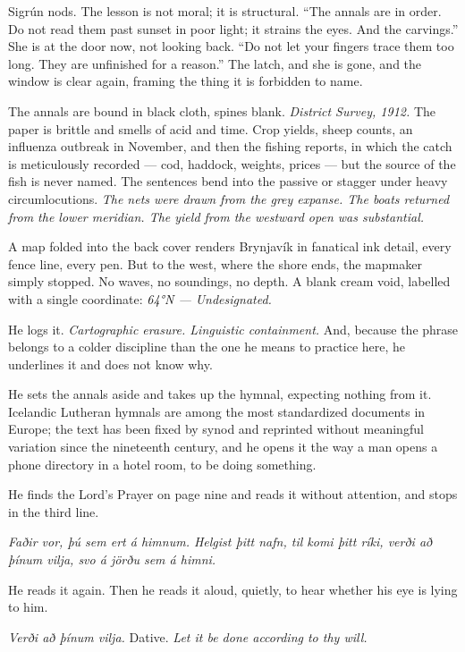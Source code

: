 \documentclass[11pt,oneside]{book}
\newcommand{\sceneline}{%
  \par\vspace{1.2em}
  \begin{center}
    \fontsize{11}{11}\selectfont \textbullet\quad\textbullet\quad\textbullet
  \end{center}
  \vspace{0.6em}\noindent\ignorespaces
}
\begin{document}
Sigrún nods. The lesson is not moral; it is structural. ``The annals are
in order. Do not read them past sunset in poor light; it strains the
eyes. And the carvings.'' She is at the door now, not looking back. ``Do
not let your fingers trace them too long. They are unfinished for a
reason.'' The latch, and she is gone, and the window is clear again,
framing the thing it is forbidden to name.

\sceneline

The annals are bound in black cloth, spines blank. \emph{District
Survey, 1912.} The paper is brittle and smells of acid and time. Crop
yields, sheep counts, an influenza outbreak in November, and then the
fishing reports, in which the catch is meticulously recorded --- cod,
haddock, weights, prices --- but the source of the fish is never named.
The sentences bend into the passive or stagger under heavy
circumlocutions. \emph{The nets were drawn from the grey expanse. The
boats returned from the lower meridian. The yield from the westward open
was substantial.}

A map folded into the back cover renders Brynjavík in fanatical ink
detail, every fence line, every pen. But to the west, where the shore
ends, the mapmaker simply stopped. No waves, no soundings, no depth. A
blank cream void, labelled with a single coordinate: \emph{64°N ---
Undesignated.}

He logs it. \emph{Cartographic erasure. Linguistic containment.} And,
because the phrase belongs to a colder discipline than the one he means
to practice here, he underlines it and does not know why.

He sets the annals aside and takes up the hymnal, expecting nothing from
it. Icelandic Lutheran hymnals are among the most standardized documents
in Europe; the text has been fixed by synod and reprinted without
meaningful variation since the nineteenth century, and he opens it the
way a man opens a phone directory in a hotel room, to be doing
something.

He finds the Lord's Prayer on page nine and reads it without attention,
and stops in the third line.

\emph{Faðir vor, þú sem ert á himnum. Helgist þitt nafn, til komi þitt
ríki, verði að þínum vilja, svo á jörðu sem á himni.}

He reads it again. Then he reads it aloud, quietly, to hear whether his
eye is lying to him.

\emph{Verði að þínum vilja.} Dative. \emph{Let it be done according to
thy will.}
\end{document}
